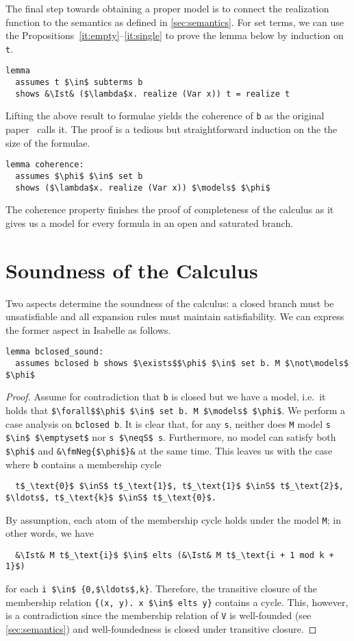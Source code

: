 \documentclass[sigplan,10pt,anonymous,review]{acmart}
\newcommand{\inS}{\in_\text{s}}
\newcommand{\neqS}{\neq_\text{s}}
\newcommand{\Ist}{I$_\text{st}$}
\newcommand{\fmNegSymbol}{\boldsymbol{\neg}}
\newcommand{\fmNeg}[1]{$\fmNegSymbol$ #1}
\begin{document}
\noindent The final step towards obtaining a proper model is to connect the realization function to the semantics as defined in \autoref{sec:semantics}.
For set terms, we can use the Propositions~\ref{it:empty}--\ref{it:single} to prove the lemma below by induction on \lstinline!t!.
\begin{lstlisting}
lemma
  assumes t $\in$ subterms b
  shows &\Ist& ($\lambda$x. realize (Var x)) t = realize t
\end{lstlisting}
Lifting the above result to formulae yields the coherence of \lstinline!b! as the original paper~\cite{new_fast_tableau} calls it.
The proof is a tedious but straightforward induction on the the size of the formulae.
\begin{lstlisting}
lemma coherence:
  assumes $\phi$ $\in$ set b
  shows ($\lambda$x. realize (Var x)) $\models$ $\phi$
\end{lstlisting}
The coherence property finishes the proof of completeness of the calculus as it gives us a model for every formula in an open and saturated branch.

\section{Soundness of the Calculus\label{sec:sound}}
Two aspects determine the soundness of the calculus: a closed branch must be unsatisfiable and all expansion rules must maintain satisfiability.
We can express the former aspect in Isabelle as follows.
\begin{lstlisting}[belowskip=0pt]
lemma bclosed_sound:
  assumes bclosed b shows $\exists$$\phi$ $\in$ set b. M $\not\models$ $\phi$
\end{lstlisting}
\begin{proof}
  Assume for contradiction that \lstinline!b! is closed but we have a model, i.e.\ it holds that \lstinline!$\forall$$\phi$ $\in$ set b. M $\models$ $\phi$!.
  We perform a case analysis on \lstinline!bclosed b!.
  It is clear that, for any \lstinline!s!, neither does \lstinline!M! model \lstinline!s $\in$ $\emptyset$! nor \lstinline!s $\neqS$ s!.
  Furthermore, no model can satisfy both \lstinline!$\phi$! and \lstinline!&\fmNeg{$\phi$}&! at the same time.
  This leaves us with the case where \lstinline!b! contains a membership cycle
\begin{lstlisting}
  t$_\text{0}$ $\inS$ t$_\text{1}$, t$_\text{1}$ $\inS$ t$_\text{2}$, $\ldots$, t$_\text{k}$ $\inS$ t$_\text{0}$.
\end{lstlisting}
  By assumption, each atom of the membership cycle holds under the model \lstinline!M!; in other words, we have
\begin{lstlisting}
  &\Ist& M t$_\text{i}$ $\in$ elts (&\Ist& M t$_\text{i + 1 mod k + 1}$)
\end{lstlisting}
  for each \lstinline!i $\in$ {0,$\ldots$,k}!.
  Therefore, the transitive closure of the membership relation \lstinline!{(x, y). x $\in$ elts y}! contains a cycle. 
  This, however, is a contradiction since the membership relation of \lstinline!V! is well-founded (see \autoref{sec:semantics}) and well-foundedness is closed under transitive closure.
\end{proof}
\end{document}
